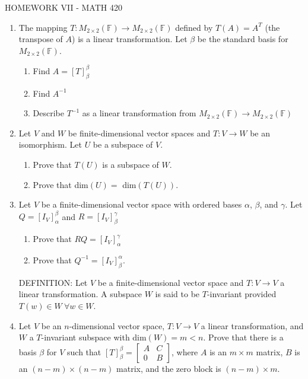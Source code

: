 \documentclass{article}
\begin{document}
\centerline{HOMEWORK VII - MATH 420}

\begin{enumerate}
\item The mapping $T:M_{2\times2}(\mathbb{F})\rightarrow M_{2\times2}(\mathbb{F})$
 defined by $T(A)=A^T$ (the transpose of $A$) is a linear transformation.  Let $\beta$ be the standard basis for $M_{2\times2}(\mathbb{F})$.
 \begin{enumerate}
   \item Find $A=[T]_\beta^\beta$
   \item Find $A^{-1}$
   \item Describe $T^{-1}$ as a linear transformation from $M_{2\times2}(\mathbb{F})\rightarrow M_{2\times2}(\mathbb{F})$
 \end{enumerate}




\item Let $V$ and $W$ be finite-dimensional vector spaces and $T:V\rightarrow W$ be an isomorphism. Let
$U$ be a subspace of $V$.
\begin{enumerate}
\item Prove that
$T(U)$ is a subspace of $W$.

\item Prove that
dim$(U)=$ dim$(T(U))$.

\end{enumerate}

\item

Let $V$ be a finite-dimensional vector space with ordered bases $\alpha$, $\beta$, and $\gamma$.  Let $Q=[I_V]_\alpha^\beta$ and $R=[I_V]_\beta^\gamma$
\begin{enumerate}
\item
Prove that $RQ=[I_V]_\alpha^\gamma$
\item Prove that $Q^{-1}=[I_V]_\beta^\alpha$.
\end{enumerate}

\medskip\noindent DEFINITION:
Let $V$ be a finite-dimensional vector space and $T:V\rightarrow V$ a linear transformation.  A subspace $W$ is said to be $T$-invariant provided $T(w)\in W\ \forall w\in W.$
\item Let $V$ be an $n$-dimensional vector space, $T:V\rightarrow V$ a linear transformation,  and $W$ a $T$-invariant subspace with dim$(W)=m<n$.  Prove that there is a basis $\beta$ for $V$ such that $[T]_\beta^\beta=\left[\begin{array}{cc}A&C\\0&B\end{array}\right]$, where $A$ is an $m\times m$ matrix, $B$ is an $(n-m)\times(n-m)$ matrix, and the zero block is $(n-m)\times m$.

     \end{enumerate}
     
\end{document}
